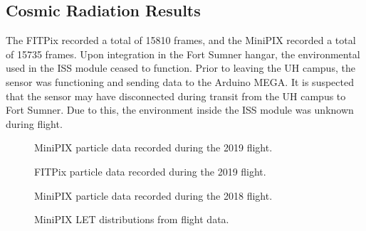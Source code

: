 \subsection{Cosmic Radiation Results}
\label{sec:Cosmic-Radiation-Results}

The FITPix recorded a total of 15810 frames, and the MiniPIX recorded a total of 15735 frames.
Upon integration in the Fort Sumner hangar, the environmental used in the ISS module ceased to function.
Prior to leaving the UH campus, the sensor was functioning and sending data to the Arduino MEGA.
It is suspected that the sensor may have disconnected during transit from the UH campus to Fort Sumner.
Due to this, the environment inside the ISS module was unknown during flight.

\begin{figure}[h!]
\hfill
{}
\hfill
{}
\hfill
\caption{MiniPIX particle data recorded during the 2019 flight.}
\label{fig:minipix-data}
\end{figure}

\begin{figure}[h!]
\hfill
{}
\hfill
{}
\hfill
\caption{FITPix particle data recorded during the 2019 flight.}
\label{fig:fitpix-data}
\end{figure}

\begin{figure}[h!]
\hfill
{}
\hfill
\caption{MiniPIX particle data recorded during the 2018 flight.}
\label{fig:2018-minipix-data}
\end{figure}


\begin{figure}[h!]
\hfill
{}
\hfill
\caption{MiniPIX LET distributions from flight data.}
\label{fig:minipix-let}
\end{figure}


